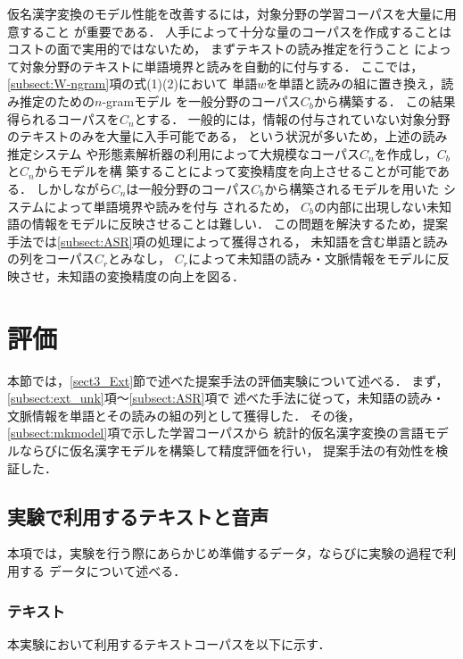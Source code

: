 \documentclass[japanese]{jnlp_1.4}
\begin{document}
仮名漢字変換のモデル性能を改善するには，対象分野の学習コーパスを大量に用意すること
が重要である．
人手によって十分な量のコーパスを作成することはコストの面で実用的ではないため，
まずテキストの読み推定を行うこと
によって対象分野のテキストに単語境界と読みを自動的に付与する．
ここでは，\ref{subsect:W-ngram}項の式(1)(2)において
単語$w$を単語と読みの組に置き換え，読み推定のための$n$-gramモデル
を一般分野のコーパス$C_b$から構築する．
この結果得られるコーパスを$C_n$とする．
一般的には，情報の付与されていない対象分野のテキストのみを大量に入手可能である，
という状況が多いため，上述の読み推定システム
や形態素解析器の利用によって大規模なコーパス$C_n$を作成し，$C_b$と$C_n$からモデルを構
築することによって変換精度を向上させることが可能である．
しかしながら$C_n$は一般分野のコーパス$C_b$から構築されるモデルを用いた
システムによって単語境界や読みを付与
されるため，
$C_b$の内部に出現しない未知語の情報をモデルに反映させることは難しい．
この問題を解決するため，提案手法では\ref{subsect:ASR}項の処理によって獲得される，
未知語を含む単語と読みの列をコーパス$C_r$とみなし，
$C_r$によって未知語の読み・文脈情報をモデルに反映させ，未知語の変換精度の向上を図る．



\section{評価}
\label{sect:eval}

本節では，\ref{sect3_Ext}節で述べた提案手法の評価実験について述べる．
まず，\ref{subsect:ext_unk}項〜\ref{subsect:ASR}項で
述べた手法に従って，未知語の読み・文脈情報を単語とその読みの組の列として獲得した．
その後，\ref{subsect:mkmodel}項で示した学習コーパスから
統計的仮名漢字変換の言語モデルならびに仮名漢字モデルを構築して精度評価を行い，
提案手法の有効性を検証した．


\subsection{実験で利用するテキストと音声}
\label{subsect:text_pre}

本項では，実験を行う際にあらかじめ準備するデータ，ならびに実験の過程で利用する
データについて述べる．


\subsubsection{テキスト}

本実験において利用するテキストコーパスを以下に示す．
\end{document}
